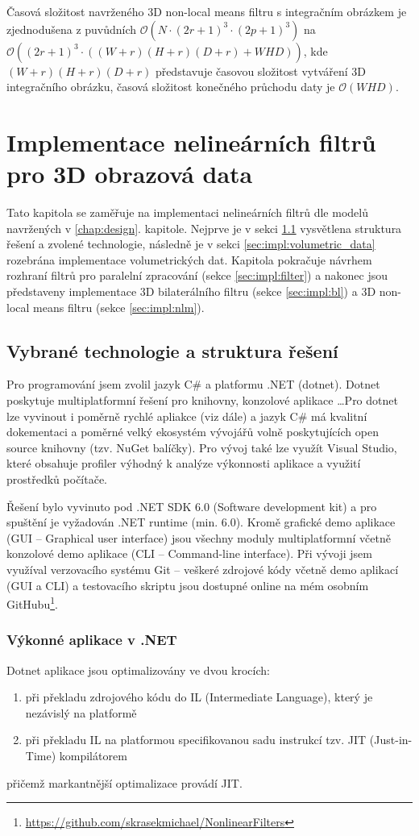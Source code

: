Časová složitost navrženého 3D non-local means filtru s integračním obrázkem je zjednodušena z puvůdních $\mathcal{O}(N \cdot (2r + 1)^3 \cdot (2p + 1)^3)$ na $\mathcal{O}((2r + 1)^3\cdot((W+r)(H+r)(D+r) + WHD))$, kde $(W+r)(H+r)(D+r)$ představuje časovou složitost vytváření 3D integračního obrázku, časová složitost konečného průchodu daty je $\mathcal{O}(WHD)$.

\chapter{Implementace nelineárních filtrů pro 3D obrazová data}
\label{chap:implementation}
Tato kapitola se zaměřuje na implementaci nelineárních filtrů dle modelů navržených v \ref{chap:design}. kapitole. Nejprve je v sekci \ref{sec:impl:technology} vysvětlena struktura řešení a zvolené technologie, následně je v sekci \ref{sec:impl:volumetric_data} rozebrána implementace volumetrických dat. Kapitola pokračuje návrhem rozhraní filtrů pro paralelní zpracování (sekce \ref{sec:impl:filter}) a nakonec jsou představeny implementace 3D bilaterálního filtru (sekce \ref{sec:impl:bl}) a 3D non-local means filtru (sekce \ref{sec:impl:nlm}).

\section{Vybrané technologie a struktura řešení}
\label{sec:impl:technology}
Pro programování jsem zvolil jazyk C\# a platformu .NET (dotnet). Dotnet poskytuje multiplatformní řešení pro knihovny, konzolové aplikace \dots Pro dotnet lze vyvinout i poměrně rychlé apliakce (viz dále) a jazyk C\# má kvalitní dokementaci a poměrné velký ekosystém vývojářů volně poskytujících open source knihovny (tzv. NuGet balíčky). Pro vývoj také lze využít Visual Studio, které obsahuje profiler výhodný k analýze výkonnosti aplikace a využití prostředků počítače. 

Řešení bylo vyvinuto pod .NET SDK 6.0 (Software development kit) a pro spuštění je vyžadován .NET runtime (min. 6.0). Kromě grafické demo aplikace (GUI -- Graphical user interface) jsou všechny moduly multiplatformní včetně konzolové demo aplikace (CLI -- Command-line interface). Při vývoji jsem využíval verzovacího systému Git -- veškeré zdrojové kódy včetně demo aplikací (GUI a CLI) a testovacího skriptu jsou dostupné online na mém osobním GitHubu\footnote{\url{https://github.com/skrasekmichael/NonlinearFilters}}.

\subsection*{Výkonné aplikace v .NET}
Dotnet aplikace jsou optimalizovány ve dvou krocích:
\begin{enumerate}
    \item při překladu zdrojového kódu do IL (Intermediate Language), který je nezávislý na platformě
    \item při překladu IL na platformou specifikovanou sadu instrukcí tzv. JIT (Just-in-Time) kompilátorem
\end{enumerate}
přičemž markantnější optimalizace provádí JIT.

